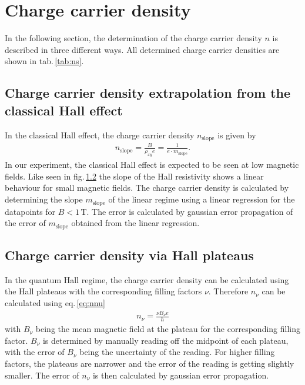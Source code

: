 \section{Charge carrier density}
In the following section, the determination of the charge carrier density $n$ is described in three different ways.
All determined charge carrier densities are shown in tab.\,\ref{tab:ns}.
\subsection{Charge carrier density extrapolation from the classical Hall effect}
In the classical Hall effect, the charge carrier density $n_\text{slope}$ is given by 
\begin{align}
    n_\text{slope} = \frac{B}{\rho_{xy}e} = \frac{1}{e \cdot m_\text{slope}}.
    \label{eq:chargeCarrierClassicalHall}
\end{align}
In our experiment, the classical Hall effect is expected to be seen at low magnetic fields.
Like seen in fig.\,\ref{} the slope of the Hall resistivity shows a linear behaviour for small magnetic fields.
The charge carrier density is calculated by determining the slope $m_\text{slope}$ of the linear regime using a linear regression
for the datapoints for $B<1\,\text{T}$.
The error is calculated by gaussian error propagation of the error of $m_\text{slope}$ obtained from the linear regression.

\subsection{Charge carrier density via Hall plateaus}
In the quantum Hall regime, the charge carrier density can be calculated using the Hall plateaus with the corresponding filling factors $\nu$.
Therefore $n_\nu$ can be calculated using eq.\,\ref{eq:nnu}
\begin{align}
    n_\nu = \frac{\nu B_\nu e}{h}
\end{align}
with $B_\nu$ being the mean magnetic field at the plateau for the corresponding filling factor.
$B_\nu$ is determined by manually reading off the midpoint of each plateau, with the error of $B_\nu$ being
the uncertainty of the reading. For higher filling factors, the plateaus are narrower and the error of the reading is getting slightly smaller.
The error of $n_\nu$ is then calculated by gaussian error propagation.

